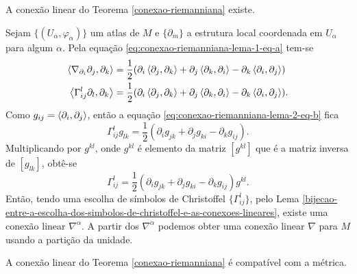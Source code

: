 \begin{lema}\label{conexao-riemanniana-lema-2}
	A conexão linear do Teorema \ref{conexao-riemanniana} existe.
\end{lema}

\begin{demonstracao}
	Sejam
	$\{ (U_{\alpha}, \varphi_{\alpha}) \}$ um atlas de $M$ e
	$\{ \partial_m \}$ a estrutura local coordenada em $U_{\alpha}$ para algum $\alpha$.
	Pela equação \eqref{eq:conexao-riemanniana-lema-1-eq-a} tem-se
	\begin{equation}\label{eq:conexao-riemanniana-lema-2-eq-b}
		\begin{split}
			\left\langle \nabla_{\partial_i} \partial_j,\partial_k \right\rangle &= \frac{1}{2} (\partial_i \left\langle \partial_j,\partial_k \right\rangle + \partial_j \left\langle \partial_k,\partial_i \right\rangle - \partial_k \left\langle \partial_i,\partial_j \right\rangle)\\
			\left\langle \Gamma_{ij}^l \partial_l,\partial_k \right\rangle &= \frac{1}{2} (\partial_i \left\langle \partial_j,\partial_k \right\rangle + \partial_j \left\langle \partial_k,\partial_i \right\rangle - \partial_k \left\langle \partial_i,\partial_j \right\rangle).		
		\end{split}		
	\end{equation}
	Como $g_{ij} = \left\langle \partial_i,\partial_j \right\rangle$, então a equação \eqref{eq:conexao-riemanniana-lema-2-eq-b} fica
	\begin{equation}\label{eq:conexao-riemanniana-lema-2-eq-a}
		\Gamma_{ij}^l g_{lk} = \frac{1}{2} (\partial_i g_{jk} + \partial_j g_{ki} - \partial_k g_{ij}).
	\end{equation}
	Multiplicando por $g^{kl}$, onde $g^{kl}$ é elemento da matriz $[g^{kl}]$ que é a matriz inversa de $[g_{lk}]$, obtê-se
	\begin{equation*}
		\Gamma_{ij}^l = \frac{1}{2} (\partial_i g_{jk} + \partial_j g_{ki} - \partial_k g_{ij}) g^{kl}.
	\end{equation*}
	Então, tendo uma escolha de símbolos de Christoffel $\{ \Gamma_{ij}^l \}$, pelo Lema \ref{bijecao-entre-a-escolha-dos-simbolos-de-christoffel-e-as-conexoes-lineares}, existe uma conexão linear $\nabla^{\alpha}$.
	A partir dos $\nabla^{\alpha}$ podemos obter uma conexão linear $\nabla$ para $M$ usando a partição da unidade.
\end{demonstracao}

\begin{lema}\label{conexao-riemanniana-lema-3}
	A conexão linear do Teorema \ref{conexao-riemanniana} é compatível com a métrica.
\end{lema}

